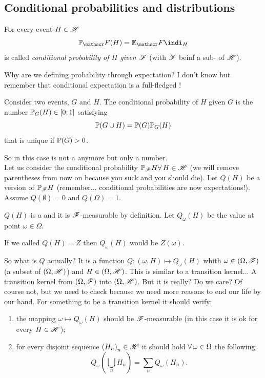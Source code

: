 \documentclass{report}
\begin{document}
\subsection{Conditional probabilities and distributions}
\begin{definition}
	For every event $H\in\mathscr{H}$
	\[\pr_\F(H)=\ev_\F\indi_H\]
	is called \emph{conditional probability of $H$ given $\mathscr{F}$} (with $\mathscr{F}$ beinf a sub-\sa{} of $\mathscr{H}$).
\end{definition}
Why are we defining probability through expectation? I don't know but remember that conditional expectation is a full-fledged \rv{}!
\begin{definition}
	Consider two events, $G$ and $H$. The conditional probability of $H$ given $G$ is the number $\mathbb{P}_G(H)\in[0,1]$ satisfying
	\[\mathbb{P}(G\cup H)=\mathbb{P}(G)\mathbb{P}_{G}(H)\]
	that is unique if $\mathbb{P}(G)>0$.
\end{definition}
So in this case is not a \rv{} anymore but only a number.\\
Let us consider the conditional probability $\mathbb{P}_{\mathscr{F}} H\forall\, H\in\mathscr{H}$ (we will remove parentheses from now on because you suck and you should die). Let $Q(H)$ be a version of $\mathbb{P}_{\mathscr{F}} H$ (remember... conditional probabilities are now expectations!). Assume $Q(\emptyset)=0$ and $Q(\Omega)=1$.\par
$Q(H)$ is a \rv{} and it is $\mathscr{F}$-measurable by definition. Let $Q_\omega(H)$ be the value at point $\omega\in\Omega$. 
\begin{notation}
	If we called $Q(H)=Z$ then $Q_\omega(H)$ would be $Z(\omega)$.
\end{notation}
So what is $Q$ actually? It is a function $Q:(\omega, H)\mapsto Q_\omega(H)$ whith $\omega\in(\Omega,\mathscr{F})$ (a subset of $(\Omega, \mathscr{H})$) and $H\in(\Omega,\mathscr{H})$. This is similar to a transition kernel... A transition kernel from $(\Omega,\mathscr{F})$ into $(\Omega,\mathscr{H})$. But it is really? Do we care? Of course not, but we need to check because we need more reasons to end our life by our hand.
	For something to be a transition kernel it should verify:
	\begin{enumerate}
		\item the mapping $\omega\mapsto Q_\omega(H)$ should be $\mathscr{F}$-measurable (in this case it is ok for every $H\in\mathscr{H}$\checkmark);
		\item for every disjoint sequence ${(H_n)}_{n}\in\mathscr{H}$ it should hold $\forall\,\omega\in\Omega$ the following:
		\begin{equation}
			Q_\omega\left(\bigcup_n H_n\right)=\sum_n Q_\omega(H_{n})\tag{$\star$}\label{asfucked}.
		\end{equation}
	\end{enumerate}
\end{document}

